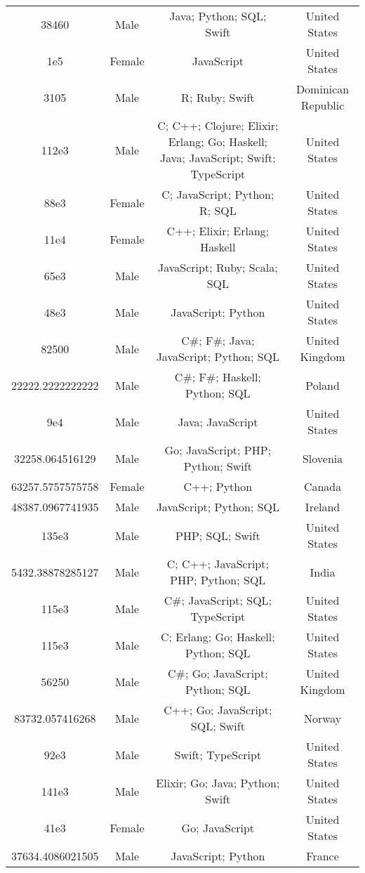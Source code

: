 \begin{center}
\begin{tabular}{ |c|c|c|c| }
38460  &  Male  &  Java; Python; SQL; Swift  &  United States  \\ 
1e5  &  Female  &  JavaScript  &  United States  \\ 
3105  &  Male  &  R; Ruby; Swift  &  Dominican Republic  \\ 
112e3  &  Male  &  C; C++; Clojure; Elixir; Erlang; Go; Haskell; Java; JavaScript; Swift; TypeScript  &  United States  \\ 
88e3  &  Female  &  C; JavaScript; Python; R; SQL  &  United States  \\ 
11e4  &  Female  &  C++; Elixir; Erlang; Haskell  &  United States  \\ 
65e3  &  Male  &  JavaScript; Ruby; Scala; SQL  &  United States  \\ 
48e3  &  Male  &  JavaScript; Python  &  United States  \\ 
82500  &  Male  &  C\#; F\#; Java; JavaScript; Python; SQL  &  United Kingdom  \\ 
22222.2222222222  &  Male  &  C\#; F\#; Haskell; Python; SQL  &  Poland  \\ 
9e4  &  Male  &  Java; JavaScript  &  United States  \\ 
32258.064516129  &  Male  &  Go; JavaScript; PHP; Python; Swift  &  Slovenia  \\ 
63257.5757575758  &  Female  &  C++; Python  &  Canada  \\ 
48387.0967741935  &  Male  &  JavaScript; Python; SQL  &  Ireland  \\ 
135e3  &  Male  &  PHP; SQL; Swift  &  United States  \\ 
5432.38878285127  &  Male  &  C; C++; JavaScript; PHP; Python; SQL  &  India  \\ 
115e3  &  Male  &  C\#; JavaScript; SQL; TypeScript  &  United States  \\ 
115e3  &  Male  &  C; Erlang; Go; Haskell; Python; SQL  &  United States  \\ 
56250  &  Male  &  C\#; Go; JavaScript; Python; SQL  &  United Kingdom  \\ 
83732.057416268  &  Male  &  C++; Go; JavaScript; SQL; Swift  &  Norway  \\ 
92e3  &  Male  &  Swift; TypeScript  &  United States  \\ 
141e3  &  Male  &  Elixir; Go; Java; Python; Swift  &  United States  \\ 
41e3  &  Female  &  Go; JavaScript  &  United States  \\ 
37634.4086021505  &  Male  &  JavaScript; Python  &  France  \\ 

\end{tabular}
\end{center}
